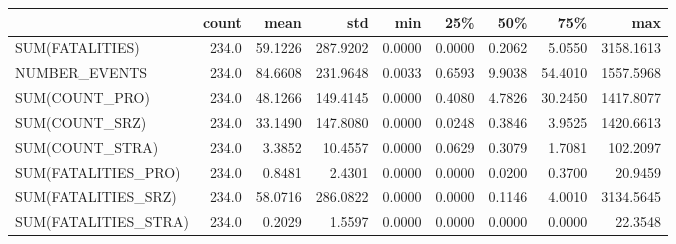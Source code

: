 \begin{tabular}{lrrrrrrrr}
\toprule
{} &  count &     mean &       std &     min &     25\% &     50\% &      75\% &        max \\
\midrule
SUM(FATALITIES)      &  234.0 &  59.1226 &  287.9202 &  0.0000 &  0.0000 &  0.2062 &   5.0550 &  3158.1613 \\
NUMBER\_EVENTS        &  234.0 &  84.6608 &  231.9648 &  0.0033 &  0.6593 &  9.9038 &  54.4010 &  1557.5968 \\
SUM(COUNT\_PRO)       &  234.0 &  48.1266 &  149.4145 &  0.0000 &  0.4080 &  4.7826 &  30.2450 &  1417.8077 \\
SUM(COUNT\_SRZ)       &  234.0 &  33.1490 &  147.8080 &  0.0000 &  0.0248 &  0.3846 &   3.9525 &  1420.6613 \\
SUM(COUNT\_STRA)      &  234.0 &   3.3852 &   10.4557 &  0.0000 &  0.0629 &  0.3079 &   1.7081 &   102.2097 \\
SUM(FATALITIES\_PRO)  &  234.0 &   0.8481 &    2.4301 &  0.0000 &  0.0000 &  0.0200 &   0.3700 &    20.9459 \\
SUM(FATALITIES\_SRZ)  &  234.0 &  58.0716 &  286.0822 &  0.0000 &  0.0000 &  0.1146 &   4.0010 &  3134.5645 \\
SUM(FATALITIES\_STRA) &  234.0 &   0.2029 &    1.5597 &  0.0000 &  0.0000 &  0.0000 &   0.0000 &    22.3548 \\
\bottomrule
\end{tabular}
